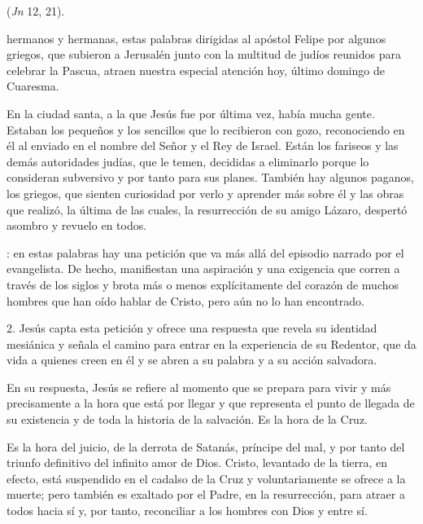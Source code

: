 
\begin{body}
 (\textit{Jn} 12, 21).

 hermanos y hermanas, estas palabras dirigidas al apóstol Felipe por algunos griegos, que subieron a Jerusalén junto con la multitud de judíos reunidos para celebrar la Pascua, atraen nuestra especial atención hoy, último domingo de Cuaresma.

En la ciudad santa, a la que Jesús fue por última vez, había mucha gente. Estaban los pequeños y los sencillos que lo recibieron con gozo, reconociendo en él al enviado en el nombre del Señor y el Rey de Israel. Están los fariseos y las demás autoridades judías, que le temen, decididas a eliminarlo porque lo consideran subversivo y por tanto  para sus planes. También hay algunos paganos, los griegos, que sienten curiosidad por verlo y aprender más sobre él y las obras que realizó, la última de las cuales, la resurrección de su amigo Lázaro, despertó asombro y revuelo en todos. 

: en estas palabras hay una petición que va más allá del episodio narrado por el evangelista. De hecho, manifiestan una aspiración y una exigencia que corren a través de los siglos y brota más o menos explícitamente del corazón de muchos hombres que han oído hablar de Cristo, pero aún no lo han encontrado.

2. Jesús capta esta petición y ofrece una respuesta que revela su identidad mesiánica y señala el camino para entrar en la experiencia de su  Redentor, que da vida a quienes creen en él y se abren a su palabra y a su acción salvadora.

En su respuesta, Jesús se refiere al momento que se prepara para vivir y más precisamente a la hora que está por llegar y que representa el punto de llegada de su existencia y de toda la historia de la salvación. Es la hora de la Cruz.

Es la hora del juicio, de la derrota de Satanás, príncipe del mal, y por tanto del triunfo definitivo del infinito amor de Dios. Cristo, levantado de la tierra, en efecto, está suspendido en el cadalso de la Cruz y voluntariamente se ofrece a la muerte; pero también es exaltado por el Padre, en la resurrección, para atraer a todos hacia sí y, por tanto, reconciliar a los hombres con Dios y entre sí.


\end{body}
